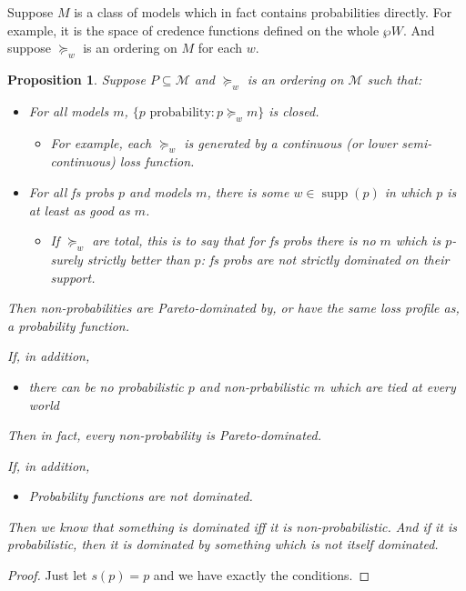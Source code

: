 \documentclass[11pt]{article}
\newtheorem{lemma}[theorem]{Lemma}
\newtheorem{proposition}[theorem]{Proposition}
\theoremstyle{definition}
\theoremstyle{remark}
\newcommand{\M}{\mathcal M}
\newcommand{\supp}{\operatorname{supp}}
\begin{document}
Suppose $M$ is a class of models which in fact contains probabilities directly. For example, it is the space of credence functions defined on the whole $\wp{W}$. And suppose $\succeq_w$ is an ordering on $M$ for each $w$. 
\begin{proposition}
	Suppose $P\subseteq\M$ and $\succeq_w$ is an ordering on $\M$ such that:
	\begin{itemize}
		\item For all models $m$, $\{p\text{ probability} : p\succeq_w m\}$ is closed. 
		\begin{itemize}
			\item For example, each $\succeq_w$ is generated by a continuous (or lower semi-continuous) loss function.
		\end{itemize}
	\item For all fs probs $p$ and models $m$, there is some $w\in\supp(p)$ in which $p$ is at least as good as $m$. 
		\begin{itemize}
			\item If $\succeq_w$ are total, this is to say that for fs probs there is no $m$ which is $p$-surely strictly better than $p$: fs probs are not strictly dominated on their support. 
		\end{itemize}
	\end{itemize}
	Then non-probabilities are Pareto-dominated by, or have the same loss profile as, a probability function. 
	
	If, in addition, 
	\begin{itemize}
		\item there can be no probabilistic $p$ and non-prbabilistic $m$ which are tied at every world
	\end{itemize}
	Then in fact, every non-probability is Pareto-dominated. 
	
	If, in addition, \begin{itemize}
		\item Probability functions are not dominated. 
	\end{itemize} Then we know that something is dominated iff it is non-probabilistic. And if it is probabilistic, then it is dominated by something which is not itself dominated. 
\end{proposition}
\begin{proof}
	Just let $s(p)=p$ and we have exactly the conditions. 
\end{proof}

\end{document}
